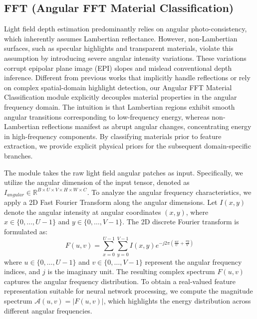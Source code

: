 \documentclass[lettersize,journal]{IEEEtran}
\begin{document}
\subsection{FFT (Angular FFT Material Classification)}

Light field depth estimation predominantly relies on angular photo-consistency, which inherently assumes Lambertian reflectance. However, non-Lambertian surfaces, such as specular highlights and transparent materials, violate this assumption by introducing severe angular intensity variations. These variations corrupt epipolar plane image (EPI) slopes and mislead conventional depth inference. Different from previous works that implicitly handle reflections or rely on complex spatial-domain highlight detection, our Angular FFT Material Classification module explicitly decouples material properties in the angular frequency domain. The intuition is that Lambertian regions exhibit smooth angular transitions corresponding to low-frequency energy, whereas non-Lambertian reflections manifest as abrupt angular changes, concentrating energy in high-frequency components. By classifying materials prior to feature extraction, we provide explicit physical priors for the subsequent domain-specific branches.

The module takes the raw light field angular patches as input. Specifically, we utilize the angular dimension of the input tensor, denoted as $I_{angular} \in \mathbb{R}^{B \times U \times V \times H \times W \times C}$. To analyze the angular frequency characteristics, we apply a 2D Fast Fourier Transform along the angular dimensions. Let $I(x, y)$ denote the angular intensity at angular coordinates $(x, y)$, where $x \in \{0, \dots, U-1\}$ and $y \in \{0, \dots, V-1\}$. The 2D discrete Fourier transform is formulated as:
\begin{equation}
\label{eq:eq1}
F(u,v) = \sum_{x=0}^{U-1}\sum_{y=0}^{V-1} I(x,y) e^{-j2\pi\left(\frac{ux}{U} + \frac{vy}{V}\right)}
\end{equation}
where $u \in \{0, \dots, U-1\}$ and $v \in \{0, \dots, V-1\}$ represent the angular frequency indices, and $j$ is the imaginary unit. The resulting complex spectrum $F(u,v)$ captures the angular frequency distribution. To obtain a real-valued feature representation suitable for neural network processing, we compute the magnitude spectrum $\mathcal{A}(u,v) = |F(u,v)|$, which highlights the energy distribution across different angular frequencies. 
\end{document}
